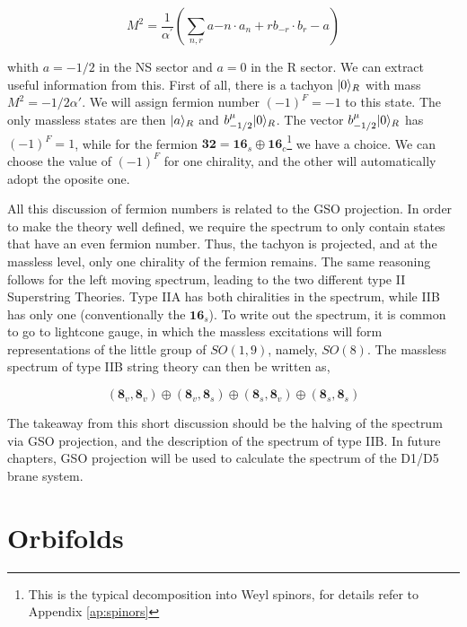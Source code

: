 
\begin{equation}
    \label{eq:mass_state}
    M^2=\frac{1}{\alpha^{\prime}}\left(\sum_{n, r} a{-n} \cdot a_n+r b_{-r} \cdot b_r-a\right)
\end{equation}

whith $a = -1/2$ in the NS sector and $a = 0$ in the R sector. We can extract useful information from this. First of all, there is a tachyon $\lvert0\rangle_R$ with mass $M^2 = -1/2\alpha '$. We will assign fermion number $(-1)^F = -1$ to this state. The only massless states are then $\lvert a\rangle_R$ and $b^\mu_{-1/2}\lvert0\rangle_R$. The vector $b^\mu_{-1/2}\lvert0\rangle_R$ has $(-1)^F = 1$, while for the fermion $\mathbf{32} = \mathbf{16}_s \oplus \mathbf{16}_c$\footnote{This is the typical decomposition into Weyl spinors, for details refer to Appendix \ref{ap:spinors}} we have a choice. We can choose the value of $(-1)^F$ for one chirality, and the other will automatically adopt the oposite one.

All this discussion of fermion numbers is related to the GSO projection. In order to make the theory well defined, we require the spectrum to only contain states that have an even fermion number. Thus, the tachyon is projected, and at the massless level, only one chirality of the fermion remains. The same reasoning follows for the left moving spectrum, leading to the two different type II Superstring Theories. Type IIA has both chiralities in the spectrum, while IIB has only one (conventionally the $\mathbf{16}_s$). To write out the spectrum, it is common to go to lightcone gauge, in which the massless excitations will form representations of the little group of $SO(1,9)$, namely, $SO(8)$. The massless spectrum of type IIB string theory can then be written as,

\begin{equation*}
    (\mathbf{8}_v, \mathbf{8}_v) \oplus (\mathbf{8}_v, \mathbf{8}_s) \oplus (\mathbf{8}_s, \mathbf{8}_v) \oplus (\mathbf{8}_s, \mathbf{8}_s)
\end{equation*}

The takeaway from this short discussion should be the halving of the spectrum via GSO projection, and the description of the spectrum of type IIB. In future chapters, GSO projection will be used to calculate the spectrum of the D1/D5 brane system.



\section{Orbifolds}
\label{sec:pre_orbi}

